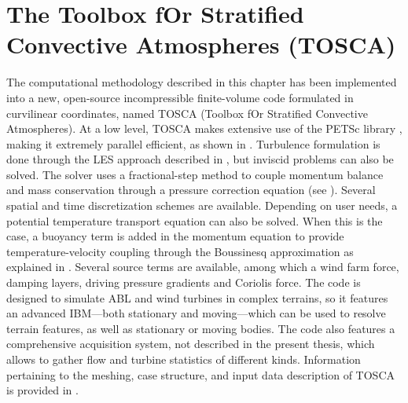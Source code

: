 \section{The Toolbox fOr Stratified Convective Atmospheres (TOSCA)}
\label{sec:tosca}
The computational methodology described in this chapter has been implemented into a new, open-source incompressible finite-volume code formulated in curvilinear coordinates, named TOSCA (Toolbox fOr Stratified Convective Atmospheres). At a low level, TOSCA makes extensive use of the PETSc library \citep{BalayEtAl2022b}, making it extremely parallel efficient, as shown in . Turbulence formulation is done through the LES approach described in , but inviscid problems can also be solved. The solver uses a fractional-step method to couple momentum balance and mass conservation through a pressure correction equation (see ). Several spatial and time discretization schemes are available. Depending on user needs, a potential temperature transport equation can also be solved. When this is the case, a buoyancy term is added in the momentum equation to provide temperature-velocity coupling through the Boussinesq approximation as explained in . Several source terms are available, among which a wind farm force, damping layers, driving pressure gradients and Coriolis force. The code is designed to simulate ABL and wind turbines in complex terrains, so it features an advanced IBM---both stationary and moving---which can be used to resolve terrain features, as well as stationary or moving bodies. The code also features a comprehensive acquisition system, not described in the present thesis, which allows to gather flow and turbine statistics of different kinds. Information pertaining to the meshing, case structure, and input data description of TOSCA is provided in .


